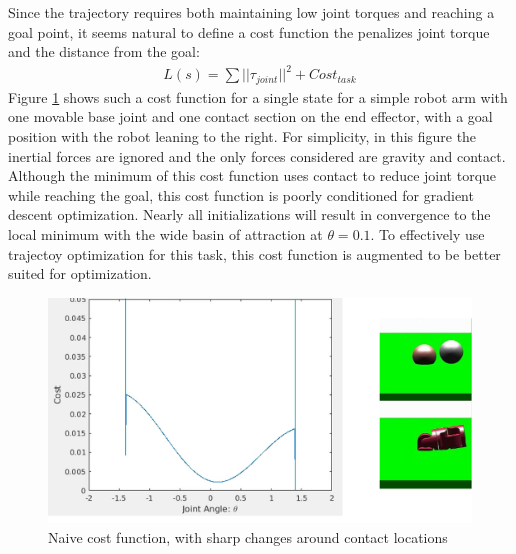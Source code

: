 \documentclass[../thesis.tex]{subfiles}
\begin{document}
Since the trajectory requires both maintaining low joint torques and reaching a goal point, it seems natural to define a cost function the penalizes joint torque and the distance from the goal:
\begin{align}
  L(s) = \sum ||\tau_{joint}||^2 + Cost_{task}
\end{align}
Figure \ref{fig:naive_cost} shows such a cost function for a single state for a simple robot arm with one movable base joint and one contact section on the end effector, with a goal position with the robot leaning to the right.
For simplicity, in this figure the inertial forces are ignored and the only forces considered are gravity and contact.
Although the minimum of this cost function uses contact to reduce joint torque while reaching the goal, this cost function is poorly conditioned for gradient descent optimization.
Nearly all initializations will result in convergence to the local minimum with the wide basin of attraction at $\theta=0.1$.
To effectively use trajectoy optimization for this task, this cost function is augmented to be better suited for optimization.


\begin{figure}
  \centering
  \includegraphics[width=\linewidth]{./Planning/naive_cost}
  \caption{Naive cost function, with sharp changes around contact locations}
  \label{fig:naive_cost}
\end{figure}
\end{document}
